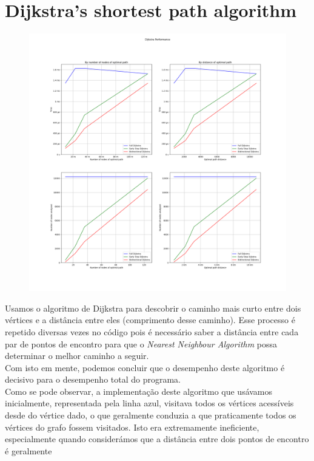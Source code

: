 \documentclass{report}
\begin{document}
  \section{Dijkstra's shortest path algorithm\cite{DIJKSTRA}}
    \begin{figure}[H]
      \centering
      \includegraphics[width=1.0\textwidth]{img/dijkstra_performance.png}
    \end{figure}
    Usamos o algoritmo de Dijkstra para descobrir o caminho mais curto entre dois
    vértices e a distância entre eles (comprimento desse caminho). Esse processo
    é repetido diversas vezes no código pois é necessário saber a distância entre
    cada par de pontos de encontro para que o \textit{Nearest Neighbour Algorithm}
    possa determinar o melhor caminho a seguir.\\
    Com isto em mente, podemos concluir que o desempenho deste algoritmo é decisivo
    para o desempenho total do programa.\\
    Como se pode observar, a implementação deste algoritmo que usávamos inicialmente,
    representada pela linha azul, visitava todos os vértices acessíveis desde do
    vértice dado, o que geralmente conduzia a que praticamente todos os vértices
    do grafo fossem visitados. Isto era extremamente ineficiente, especialmente
    quando considerámos que a distância entre dois pontos de encontro é geralmente
\end{document}
